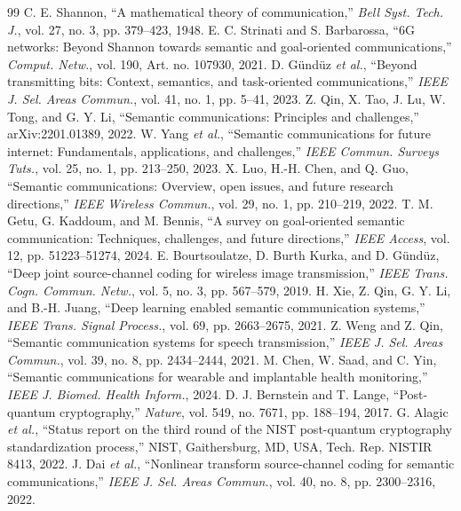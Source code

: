 \documentclass[journal]{IEEEtran}
\begin{document}
\begin{thebibliography}{99}
 C. E. Shannon, ``A mathematical theory of communication,'' \emph{Bell Syst. Tech. J.}, vol. 27, no. 3, pp. 379--423, 1948.
 E. C. Strinati and S. Barbarossa, ``6G networks: Beyond Shannon towards semantic and goal-oriented communications,'' \emph{Comput. Netw.}, vol. 190, Art. no. 107930, 2021.
 D. G\"und\"uz \emph{et al.}, ``Beyond transmitting bits: Context, semantics, and task-oriented communications,'' \emph{IEEE J. Sel. Areas Commun.}, vol. 41, no. 1, pp. 5--41, 2023.
 Z. Qin, X. Tao, J. Lu, W. Tong, and G. Y. Li, ``Semantic communications: Principles and challenges,'' arXiv:2201.01389, 2022.
 W. Yang \emph{et al.}, ``Semantic communications for future internet: Fundamentals, applications, and challenges,'' \emph{IEEE Commun. Surveys Tuts.}, vol. 25, no. 1, pp. 213--250, 2023.
 X. Luo, H.-H. Chen, and Q. Guo, ``Semantic communications: Overview, open issues, and future research directions,'' \emph{IEEE Wireless Commun.}, vol. 29, no. 1, pp. 210--219, 2022.
 T. M. Getu, G. Kaddoum, and M. Bennis, ``A survey on goal-oriented semantic communication: Techniques, challenges, and future directions,'' \emph{IEEE Access}, vol. 12, pp. 51223--51274, 2024.
 E. Bourtsoulatze, D. Burth Kurka, and D. G\"und\"uz, ``Deep joint source-channel coding for wireless image transmission,'' \emph{IEEE Trans. Cogn. Commun. Netw.}, vol. 5, no. 3, pp. 567--579, 2019.
 H. Xie, Z. Qin, G. Y. Li, and B.-H. Juang, ``Deep learning enabled semantic communication systems,'' \emph{IEEE Trans. Signal Process.}, vol. 69, pp. 2663--2675, 2021.
 Z. Weng and Z. Qin, ``Semantic communication systems for speech transmission,'' \emph{IEEE J. Sel. Areas Commun.}, vol. 39, no. 8, pp. 2434--2444, 2021.
 M. Chen, W. Saad, and C. Yin, ``Semantic communications for wearable and implantable health monitoring,'' \emph{IEEE J. Biomed. Health Inform.}, 2024.
 D. J. Bernstein and T. Lange, ``Post-quantum cryptography,'' \emph{Nature}, vol. 549, no. 7671, pp. 188--194, 2017.
 G. Alagic \emph{et al.}, ``Status report on the third round of the NIST post-quantum cryptography standardization process,'' NIST, Gaithersburg, MD, USA, Tech. Rep. NISTIR 8413, 2022.
 J. Dai \emph{et al.}, ``Nonlinear transform source-channel coding for semantic communications,'' \emph{IEEE J. Sel. Areas Commun.}, vol. 40, no. 8, pp. 2300--2316, 2022.

\end{thebibliography}
\end{document}
